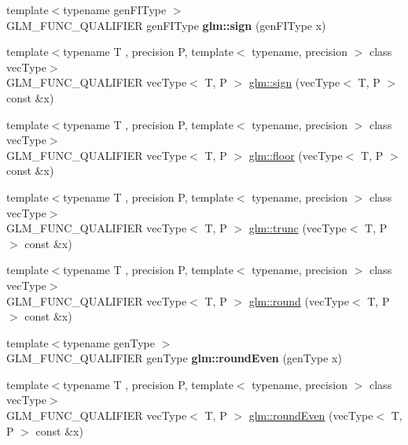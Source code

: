 \begin{DoxyCompactItemize}
\item 
\mbox{\label{func__common_8inl_a4cb99d6c397185120f49d1d56cf45b84}} 
{\footnotesize template$<$typename gen\+F\+I\+Type $>$ }\\G\+L\+M\+\_\+\+F\+U\+N\+C\+\_\+\+Q\+U\+A\+L\+I\+F\+I\+ER gen\+F\+I\+Type {\bfseries glm\+::sign} (gen\+F\+I\+Type x)
\item 
{\footnotesize template$<$typename T , precision P, template$<$ typename, precision $>$ class vec\+Type$>$ }\\G\+L\+M\+\_\+\+F\+U\+N\+C\+\_\+\+Q\+U\+A\+L\+I\+F\+I\+ER vec\+Type$<$ T, P $>$ \hyperlink{group__core__func__common_gac3446b4138e0b8757561c07cd19f084d}{glm\+::sign} (vec\+Type$<$ T, P $>$ const \&x)
\item 
{\footnotesize template$<$typename T , precision P, template$<$ typename, precision $>$ class vec\+Type$>$ }\\G\+L\+M\+\_\+\+F\+U\+N\+C\+\_\+\+Q\+U\+A\+L\+I\+F\+I\+ER vec\+Type$<$ T, P $>$ \hyperlink{group__core__func__common_ga568b822b78f045f77c3325e165b44d5d}{glm\+::floor} (vec\+Type$<$ T, P $>$ const \&x)
\item 
{\footnotesize template$<$typename T , precision P, template$<$ typename, precision $>$ class vec\+Type$>$ }\\G\+L\+M\+\_\+\+F\+U\+N\+C\+\_\+\+Q\+U\+A\+L\+I\+F\+I\+ER vec\+Type$<$ T, P $>$ \hyperlink{group__core__func__common_ga634cdbf8b37edca03f2248450570fd54}{glm\+::trunc} (vec\+Type$<$ T, P $>$ const \&x)
\item 
{\footnotesize template$<$typename T , precision P, template$<$ typename, precision $>$ class vec\+Type$>$ }\\G\+L\+M\+\_\+\+F\+U\+N\+C\+\_\+\+Q\+U\+A\+L\+I\+F\+I\+ER vec\+Type$<$ T, P $>$ \hyperlink{group__core__func__common_gada0165544c0618d634c8056a88082ce9}{glm\+::round} (vec\+Type$<$ T, P $>$ const \&x)
\item 
\mbox{\label{func__common_8inl_ae02684863360f29d6e9fb9b5ad4ab5d9}} 
{\footnotesize template$<$typename gen\+Type $>$ }\\G\+L\+M\+\_\+\+F\+U\+N\+C\+\_\+\+Q\+U\+A\+L\+I\+F\+I\+ER gen\+Type {\bfseries glm\+::round\+Even} (gen\+Type x)
\item 
{\footnotesize template$<$typename T , precision P, template$<$ typename, precision $>$ class vec\+Type$>$ }\\G\+L\+M\+\_\+\+F\+U\+N\+C\+\_\+\+Q\+U\+A\+L\+I\+F\+I\+ER vec\+Type$<$ T, P $>$ \hyperlink{group__core__func__common_ga655598104195a60a950291485e84a97e}{glm\+::round\+Even} (vec\+Type$<$ T, P $>$ const \&x)

\end{DoxyCompactItemize}
